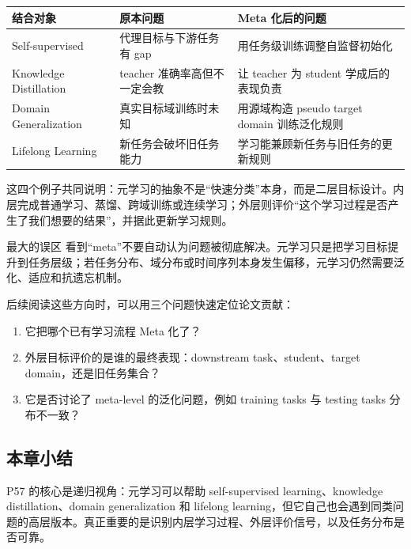 \documentclass[a4paper]{article}
\begin{document}
\begin{center}
\begin{tabular}{L{0.24\textwidth} L{0.32\textwidth} L{0.32\textwidth}}
\toprule
结合对象 & 原本问题 & Meta 化后的问题 \\
\midrule
Self-supervised & 代理目标与下游任务有 gap & 用任务级训练调整自监督初始化 \\
Knowledge Distillation & teacher 准确率高但不一定会教 & 让 teacher 为 student 学成后的表现负责 \\
Domain Generalization & 真实目标域训练时未知 & 用源域构造 pseudo target domain 训练泛化规则 \\
Lifelong Learning & 新任务会破坏旧任务能力 & 学习能兼顾新任务与旧任务的更新规则 \\
\bottomrule
\end{tabular}
\end{center}

这四个例子共同说明：元学习的抽象不是“快速分类”本身，而是二层目标设计。内层完成普通学习、蒸馏、跨域训练或连续学习；外层则评价“这个学习过程是否产生了我们想要的结果”，并据此更新学习规则。

\begin{warningbox}{最大的误区}
    看到“meta”不要自动认为问题被彻底解决。元学习只是把学习目标提升到任务层级；若任务分布、域分布或时间序列本身发生偏移，元学习仍然需要泛化、适应和抗遗忘机制。
\end{warningbox}

后续阅读这些方向时，可以用三个问题快速定位论文贡献：
\begin{enumerate}
    \item 它把哪个已有学习流程 Meta 化了？
    \item 外层目标评价的是谁的最终表现：downstream task、student、target domain，还是旧任务集合？
    \item 它是否讨论了 meta-level 的泛化问题，例如 training tasks 与 testing tasks 分布不一致？
\end{enumerate}

\subsection{本章小结}

P57 的核心是递归视角：元学习可以帮助 self-supervised learning、knowledge distillation、domain generalization 和 lifelong learning，但它自己也会遇到同类问题的高层版本。真正重要的是识别内层学习过程、外层评价信号，以及任务分布是否可靠。
\end{document}
